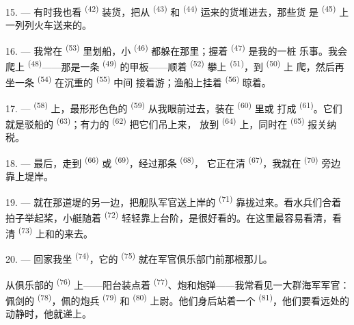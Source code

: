 15. --- 有时我也看 \textsuperscript{(42)} 装货，把从
\textsuperscript{(43)} 和 \textsuperscript{(44)} 运来的货堆进去，那些货
是 \textsuperscript{(45)} 上一列列火车送来的。

\VUsaut{3.0mm}
\VUsaut{3.0mm}

16. --- 我常在 \textsuperscript{(53)} 里划船，小
\textsuperscript{(46)} 都躲在那里；握着 \textsuperscript{(47)} 是我的一桩
乐事。我会爬上 \textsuperscript{(48)}——那是一条
 \textsuperscript{(49)} 的甲板——顺着 \textsuperscript{(52)}
攀上 \textsuperscript{(51)}，到 \textsuperscript{(50)} 上
爬，然后再坐一条
 \textsuperscript{(54)} 在沉重的 \textsuperscript{(55)} 中间
接着游；渔船上挂着 \textsuperscript{(56)} 晾着。

17. ---  \textsuperscript{(58)} 上，最形形色色的
\textsuperscript{(59)} 从我眼前过去，装在 \textsuperscript{(60)} 里或
打成 \textsuperscript{(61)}。它们就是驳船的
\textsuperscript{(63)}；有力的 \textsuperscript{(62)} 把它们吊上来，
放到 \textsuperscript{(64)} 上，同时在
\textsuperscript{(65)} 报关纳税。

18. --- 最后，走到 \textsuperscript{(66)} 或
\textsuperscript{(69)}，经过那条 \textsuperscript{(68)}，
它正在清 \textsuperscript{(67)}，我就在 \textsuperscript{(70)}
旁边靠上堤岸。

19. --- 就在那道堤的另一边，把舰队军官送上岸的 \textsuperscript{(71)}
靠拢过来。看水兵们合着拍子举起桨，小艇随着 \textsuperscript{(72)}
轻轻靠上台阶，是很好看的。在这里最容易看清，看清
 \textsuperscript{(73)} 上和的来去。

\VUsaut{3.0mm}
\VUsaut{3.0mm}

20. --- 回家我坐 \textsuperscript{(74)}，它的
\textsuperscript{(75)} 就在军官俱乐部门前那根那儿。

从俱乐部的 \textsuperscript{(76)} 上——阳台装点着
\textsuperscript{(77)}、炮和炮弹——我常看见一大群海军军官：佩剑的
\textsuperscript{(78)}，佩的炮兵 \textsuperscript{(79)} 和
 \textsuperscript{(80)} 上尉。他们身后站着一个
\textsuperscript{(81)}，他们要看远处的动静时，他就递上。

